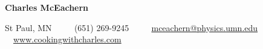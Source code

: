 \begin{center}
    {\Huge \textbf{Charles McEachern}}

    \vspace{7px}

    St Paul, MN
    \ \ \textbullet
    \ \ (651) 269-9245
    \ \ \textbullet
    \ \ \href{mailto:mceachern@physics.umn.edu}{mceachern@physics.umn.edu}
    \ \ \textbullet
    \ \ \href{www.cookingwithcharles.com}{www.cookingwithcharles.com}

%
\end{center}
